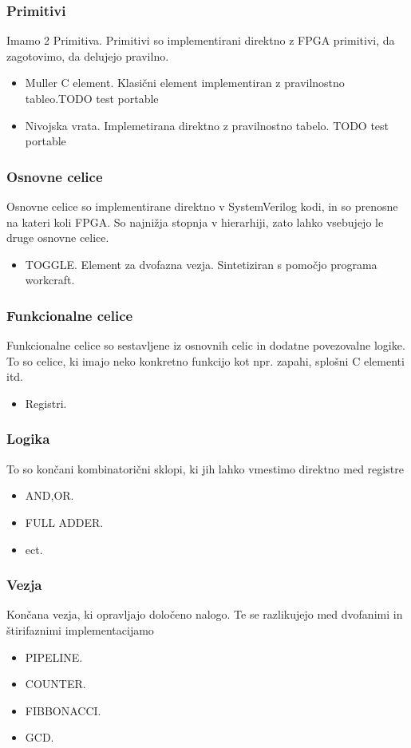 \subsubsection{Primitivi} \label{b}
Imamo 2 Primitiva. Primitivi so implementirani direktno z FPGA primitivi, da zagotovimo, da delujejo pravilno.

\begin{itemize}
	\item Muller C element. Klasični element implementiran z pravilnostno tableo.TODO test portable
	\item Nivojska vrata. Implemetirana direktno z pravilnostno tabelo. TODO test portable
\end{itemize}

\subsubsection{Osnovne celice} \label{b}
Osnovne celice so implementirane direktno v SystemVerilog kodi, in so prenosne na kateri koli FPGA. So najnižja stopnja v hierarhiji, zato lahko vsebujejo le druge osnovne celice.

\begin{itemize}
	\item TOGGLE. Element za dvofazna vezja. Sintetiziran s pomočjo programa workcraft. 
\end{itemize}


\subsubsection{Funkcionalne celice} \label{b}
Funkcionalne celice so sestavljene iz osnovnih celic in dodatne povezovalne logike. To so celice, ki imajo neko konkretno funkcijo kot npr. zapahi, splošni C elementi itd. 


\begin{itemize}
	\item Registri. 
\end{itemize}


\subsubsection{Logika} \label{b}
To so končani kombinatorični sklopi, ki jih lahko vmestimo direktno med registre

\begin{itemize}
	\item AND,OR. 
	\item FULL ADDER. 
	\item ect. 
\end{itemize}

\subsubsection{Vezja} \label{b}
Končana vezja, ki opravljajo določeno nalogo. Te se razlikujejo med dvofanimi in štirifaznimi implementacijamo

\begin{itemize}
	\item PIPELINE. 
	\item COUNTER. 
	\item FIBBONACCI. 
	\item GCD. 
\end{itemize}





